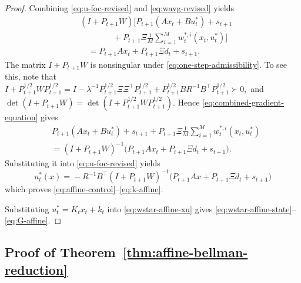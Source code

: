 \documentclass[10pt,journal,twoside]{IEEEtran}
\theoremstyle{definition}
\theoremstyle{remark}
\begin{document}
\begin{proof}
	Combining \eqref{eq:u-foc-revised} and \eqref{eq:wavg-revised} yields
	\begin{equation}
		\begin{aligned}
			&(I+P_{t+1}W)
			\Bigg[
			P_{t+1}(Ax_t+Bu_t^*)
			+s_{t+1}  \\
			&\qquad\qquad
			+P_{t+1}\Xi
			\frac1M\sum_{i=1}^M
			w_t^{*,i}(x_t,u_t^*)
			\Bigg]  \\
			&\quad =
			P_{t+1}Ax_t+P_{t+1}\Xi d_t+s_{t+1}.
		\end{aligned}
		\label{eq:combined-gradient-equation}
	\end{equation}
	The matrix \(I+P_{t+1}W\) is nonsingular under
	\eqref{eq:one-step-admissibility}. To see this, note that
	\(
	I+P_{t+1}^{1/2}WP_{t+1}^{1/2}
	=
	I-\lambda^{-1}P_{t+1}^{1/2}\Xi\Xi^\top P_{t+1}^{1/2}
	+P_{t+1}^{1/2}BR^{-1}B^\top P_{t+1}^{1/2}
	\succ0,
	\)
	and
	\(
	\det(I+P_{t+1}W)
	=
	\det(I+P_{t+1}^{1/2}WP_{t+1}^{1/2}).
	\)
	Hence \eqref{eq:combined-gradient-equation} gives
	\begin{equation*}
		\begin{aligned}
			& P_{t+1}(Ax_t+Bu_t^*)
			+s_{t+1}  
			+P_{t+1}\Xi
			\frac1M\sum_{i=1}^M
			w_t^{*,i}(x_t,u_t^*)  \\
			&=
			(I+P_{t+1}W)^{-1}
			\big(P_{t+1}Ax_t+P_{t+1}\Xi d_t+s_{t+1}\big).
		\end{aligned}
	\end{equation*}
	Substituting it into
	\eqref{eq:u-foc-revised} yields
	\begin{equation*}
			u_t^*(x)\!
	=\!
	-R^{-1}\!B^\top\!
	(I+P_{t+1}W)^{-1} \!
	\big(
	P_{t+1}Ax
	+\!P_{t+1}\Xi d_t
	+s_{t+1}
	\big)
	\end{equation*}
	which proves \eqref{eq:affine-control}--\eqref{eq:k-affine}.
	
	Substituting \(u_t^*=K_tx_t+k_t\) into
	\eqref{eq:wstar-affine-xu} gives
	\eqref{eq:wstar-affine-state}--\eqref{eq:G-affine}.
\end{proof}


\subsection{Proof of Theorem~\ref{thm:affine-bellman-reduction}}
\label{app:thm1}
\end{document}
